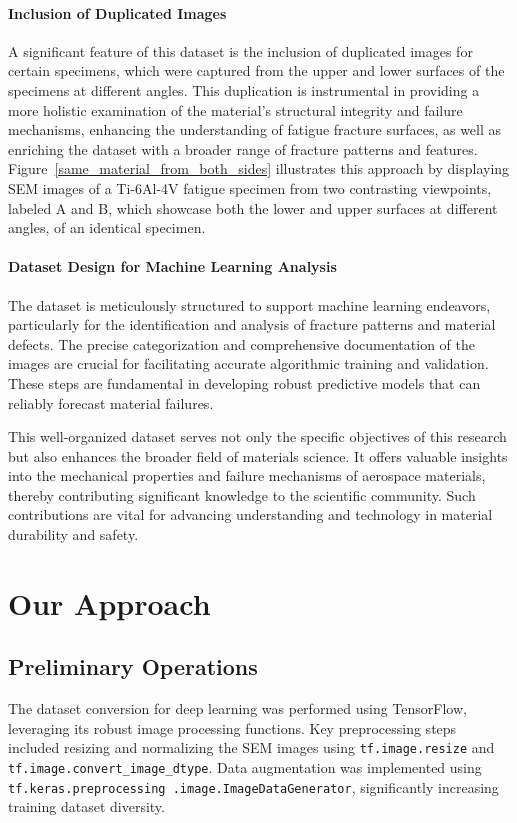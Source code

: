 \documentclass{ieeeaccess}
\begin{document}
\paragraph{Inclusion of Duplicated Images}
A significant feature of this dataset is the inclusion of duplicated images for certain specimens, which were captured from the upper and lower surfaces of the specimens at different angles. This duplication is instrumental in providing a more holistic examination of the material's structural integrity and failure mechanisms, enhancing the understanding of fatigue fracture surfaces, as well as enriching the dataset with a broader range of fracture patterns and features.  Figure~\ref{same_material_from_both_sides} illustrates this approach by displaying SEM images of a Ti-6Al-4V fatigue specimen from two contrasting viewpoints, labeled A and B, which showcase both the lower and upper surfaces at different angles, of an identical specimen.

\paragraph{Dataset Design for Machine Learning Analysis}
The dataset is meticulously structured to support machine learning endeavors, particularly for the identification and analysis of fracture patterns and material defects. The precise categorization and comprehensive documentation of the images are crucial for facilitating accurate algorithmic training and validation. These steps are fundamental in developing robust predictive models that can reliably forecast material failures.

This well-organized dataset serves not only the specific objectives of this research but also enhances the broader field of materials science. It offers valuable insights into the mechanical properties and failure mechanisms of aerospace materials, thereby contributing significant knowledge to the scientific community. Such contributions are vital for advancing understanding and technology in material durability and safety.


\section{Our Approach} \label{Our Approach}
\subsection{Preliminary Operations}
\label{subsec:preliminary_operations}
The dataset conversion for deep learning was performed using TensorFlow, leveraging its robust image processing functions. Key preprocessing steps included resizing and normalizing the SEM images using \texttt{tf.image.resize} and \texttt{tf.image.convert\_image\_dtype}. Data augmentation was implemented using \texttt{tf.keras.preprocessing
.image.ImageDataGenerator}, significantly increasing training dataset diversity.
\end{document}
